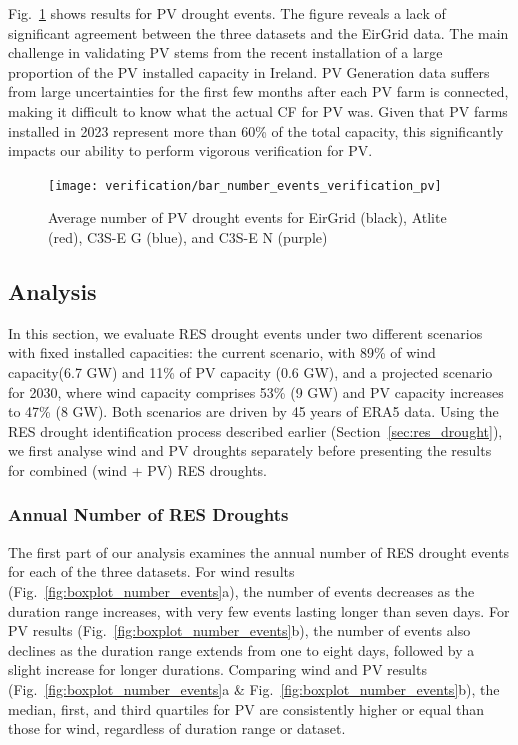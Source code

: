 \documentclass[a4paper, 11pt]{article}
\begin{document}
Fig.~\ref{fig:bar_number_events_verification_pv} shows results for PV drought events. The figure reveals a lack of significant agreement between the three datasets and the EirGrid data. The main challenge in validating PV stems from the recent installation of a large proportion of the PV installed capacity in Ireland. PV Generation data suffers from large uncertainties for the first few months after each PV farm is connected, making it difficult to know what the actual CF for PV was. Given that PV farms installed in 2023 represent more than 60\% of the total capacity, this significantly impacts our ability to perform vigorous verification for PV.

\begin{figure}[!ht]
	\centering
	\texttt{[image: verification/bar\_number\_events\_verification\_pv]}
	\caption{Average number of PV drought events for EirGrid (black), Atlite (red), C3S-E G (blue), and C3S-E N (purple)}
	\label{fig:bar_number_events_verification_pv}
\end{figure}


\newpage
\subsection{Analysis}
\label{sec:analysis}

In this section, we evaluate RES drought events under two different scenarios with fixed installed capacities: the current scenario, with 89\% of wind capacity(6.7 GW) and 11\% of PV capacity (0.6 GW), and a projected scenario for 2030, where wind capacity comprises 53\% (9 GW) and PV capacity increases to 47\% (8 GW). Both scenarios are driven by 45 years of ERA5 data. Using the RES drought identification process described earlier (Section~\ref{sec:res_drought}), we first analyse wind and PV droughts separately before presenting the results for combined (wind + PV) RES droughts.

\subsubsection{Annual Number of RES Droughts}

The first part of our analysis examines the annual number of RES drought events for each of the three datasets. For wind results (Fig.~\ref{fig:boxplot_number_events}a), the number of events decreases as the duration range increases, with very few events lasting longer than seven days. For PV results (Fig.~\ref{fig:boxplot_number_events}b), the number of events also declines as the duration range extends from one to eight days, followed by a slight increase for longer durations. Comparing wind and PV results (Fig.~\ref{fig:boxplot_number_events}a \& Fig.~\ref{fig:boxplot_number_events}b), the median, first, and third quartiles for PV are consistently higher or equal than those for wind, regardless of duration range or dataset. 
\end{document}
